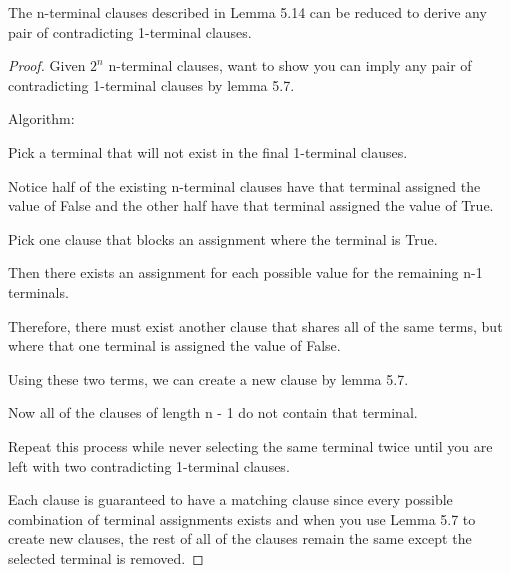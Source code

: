 \documentclass[manuscript]{acmart}
\begin{document}
    \begin{lemma}
        The n-terminal clauses described in Lemma 5.14 can be reduced to derive any pair of contradicting 1-terminal clauses.
    \end{lemma}
    \begin{proof}
        Given $2^n$ n-terminal clauses, want to show you can imply any pair of contradicting 1-terminal clauses by lemma 5.7.

        Algorithm: 

        Pick a terminal that will not exist in the final 1-terminal clauses.

        Notice half of the existing n-terminal clauses have that terminal assigned the value of False and the other half have that terminal assigned the value of True.

        Pick one clause that blocks an assignment where the terminal is True.

        Then there exists an assignment for each possible value for the remaining n-1 terminals.

        Therefore, there must exist another clause that shares all of the same terms, but where that one terminal is assigned the value of False.

        Using these two terms, we can create a new clause by lemma 5.7.

        Now all of the clauses of length n - 1 do not contain that terminal.

        Repeat this process while never selecting the same terminal twice
        until you are left with two contradicting 1-terminal clauses.

        Each clause is guaranteed to have a matching clause since every possible combination of terminal assignments exists and when you use Lemma 5.7 to create new clauses, the rest of all of the clauses remain the same except the selected terminal is removed.
    \end{proof}
\end{document}
